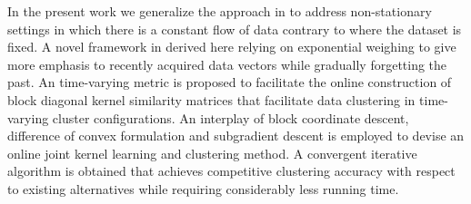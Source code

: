 \documentclass[10pt,final]{IEEEtran}
\begin{document}
In the present work we generalize the approach in \cite{DCA} to address non-stationary settings in which there is a constant flow of data contrary to \cite{SPMKC,tkmgc,DCA} where the dataset is fixed. A novel framework in derived here relying on exponential weighing to give more emphasis to recently acquired data vectors while gradually forgetting the past. An time-varying  metric is proposed to 
facilitate the online construction of block diagonal kernel similarity matrices that facilitate data clustering in time-varying cluster configurations. An interplay of block coordinate descent, difference of convex formulation and subgradient descent \cite{Convex Analysis,subgradient methods,Convex} is employed to devise an online joint kernel learning and clustering method. A convergent iterative algorithm is obtained that achieves competitive clustering accuracy with respect to existing alternatives \cite{SPMKC,tkmgc} while requiring considerably less running time.





\end{document}
